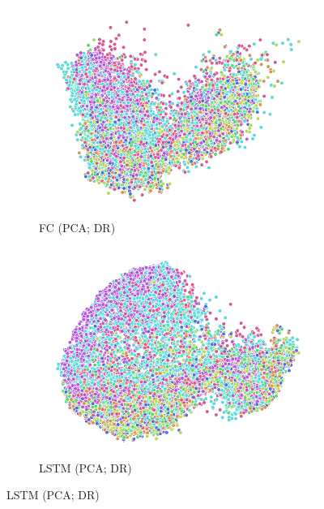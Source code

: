 \begin{figure}
\begin{subfigure}{0.22\textwidth}
    \includegraphics[width=\textwidth]{figures/chapter6/embeddings/jaco_DR_prop_fc1_PCA.png}
    \caption{FC (PCA; DR)}
  \end{subfigure}
  \begin{subfigure}{0.22\textwidth}
    \includegraphics[width=\textwidth]{figures/chapter6/embeddings/jaco_DR_prop_h_PCA.png}
    \caption{LSTM (PCA; DR)}
  \end{subfigure}


\end{figure}
